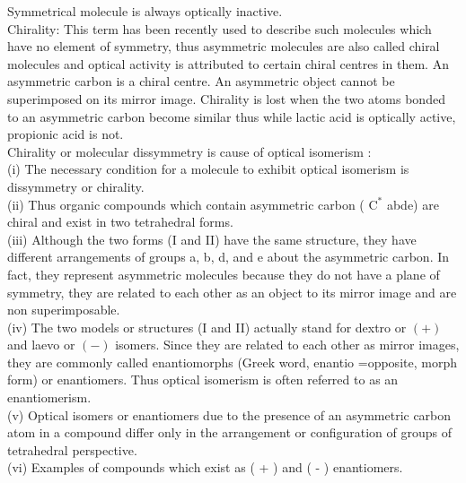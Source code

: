 \documentclass[10pt]{article}
\begin{document}
Symmetrical molecule is always optically inactive.\\
Chirality: This term has been recently used to describe such molecules which have no element of symmetry, thus asymmetric molecules are also called chiral molecules and optical activity is attributed to certain chiral centres in them. An asymmetric carbon is a chiral centre. An asymmetric object cannot be superimposed on its mirror image. Chirality is lost when the two atoms bonded to an asymmetric carbon become similar thus while lactic acid is optically active, propionic acid is not.\\
Chirality or molecular dissymmetry is cause of optical isomerism :\\
(i) The necessary condition for a molecule to exhibit optical isomerism is dissymmetry or chirality.\\
(ii) Thus organic compounds which contain asymmetric carbon ( $\mathrm{C}^{*}$ abde) are chiral and exist in two tetrahedral forms.\\
(iii) Although the two forms (I and II) have the same structure, they have different arrangements of groups a, b, d, and e about the asymmetric carbon. In fact, they represent asymmetric molecules because they do not have a plane of symmetry, they are related to each other as an object to its mirror image and are non superimposable.\\
(iv) The two models or structures (I and II) actually stand for dextro or $(+)$ and laevo or $(-)$ isomers. Since they are related to each other as mirror images, they are commonly called enantiomorphs (Greek word, enantio =opposite, morph form) or enantiomers. Thus optical isomerism is often referred to as an enantiomerism.\\
(v) Optical isomers or enantiomers due to the presence of an asymmetric carbon atom in a compound differ only in the arrangement or configuration of groups of tetrahedral perspective.\\
(vi) Examples of compounds which exist as ( + ) and ( - ) enantiomers.
\end{document}
